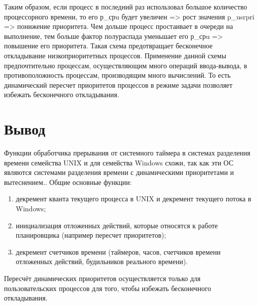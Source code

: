 Таким образом, если процесс в последний раз использовал большое количество процессорного времени, то его р\_срu будет увеличен => рост значения p\_usrpri => понижение приоритета.  Чем дольше процесс простаивает в очереди на выполнение, тем больше фактор полураспада уменьшает его р\_срu => повышение его приоритета. Такая схема предотвращает бесконечное откладывание низкоприоритетных процессов. Применение данной схемы предпочтительно процессам, осуществляющим много операций ввода-вывода, в противоположность процессам, производящим много вычислений. То есть динамический пересчет приоритетов процессов в режиме задачи позволяет избежать бесконечного откладывания.


\chapter{Вывод}
Функции обработчика прерывания от системного таймера в системах разделения времени семейства UNIX и для семейства Windows схожи, так как эти ОС являются системами разделения времени с динамическими приоритетами и вытеснением.. Общие основные функции:
\begin{enumerate}[label=\arabic*)]
	\item декремент кванта текущего процесса в UNIX и декремент текущего потока в Windows;
	\item инициализация отложенных действий, которые относятся к работе планировщика (например пересчет приоритетов);
	\item декремент счетчиков времени (таймеров, часов, счетчиков времени отложенных действий, будильников реального времени).
\end{enumerate}


Пересчёт динамических приоритетов осуществляется только для пользовательских процессов для того, чтобы избежать бесконечного откладывания.

\clearpage


